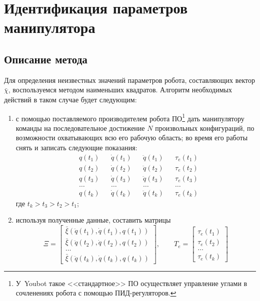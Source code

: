 \section{Идентификация параметров манипулятора}\label{part_identification}
\subsection{Описание метода}
Для определения неизвестных значений параметров робота, составляющих вектор $\bar\chi$, воспользуемся методом наименьших квадратов.
Алгоритм необходимых действий в таком случае будет следующим:
\begin{enumerate}
    \item с помощью поставляемого производителем робота ПО\footnote{У~Youbot такое <<стандартное>> ПО осуществляет управление углами в сочленениях робота с помощью ПИД-регуляторов.} дать манипулятору команды на последовательное достижение $N$ произвольных конфигураций, по возможности охватывающих всю его рабочую область; во время его работы снять и записать следующие показания:
        \begin{align*}
            &q(t_1) &&\dot{q}(t_1) &&\ddot{q}(t_1) && \tau_e(t_1) \\
            &q(t_2) &&\dot{q}(t_2) &&\ddot{q}(t_2) && \tau_e(t_2) \\
            &q(t_3) &&\dot{q}(t_3) &&\ddot{q}(t_3) && \tau_e(t_3) \\
            &\ldots &&\ldots &&\ldots && \ldots \\
            &q(t_{k}) &&\dot{q}(t_k) &&\ddot{q}(t_k) && \tau_e(t_k)
        \end{align*}
        где $t_k>t_3>t_2>t_1$;
    \item используя полученные данные, составить матрицы
        \begin{equation}
            \Xi =
            \begin{bmatrix}
                \bar\xi(\ddot{q}(t_1), \dot{q}(t_1), q(t_1)) \\
                \bar\xi(\ddot{q}(t_2), \dot{q}(t_2), q(t_2)) \\
                \ldots \\
                \bar\xi(\ddot{q}(t_k), \dot{q}(t_k), q(t_k))
            \end{bmatrix}\!\!,
            \qquad
            T_e =
            \begin{bmatrix}
                \tau_e(t_1) \\ \tau_e(t_2) \\ \ldots \\ \tau_e(t_k)

\end{bmatrix}
\end{equation}
\end{enumerate}
